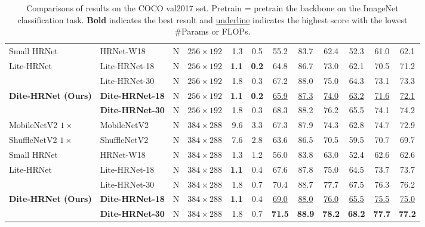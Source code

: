\documentclass{article}
\begin{document}
\begin{table*}[t]
{\begin{tabular}{llclrccccccc}
Small HRNet \cite{wang:smallhrnet} & HRNet-W18 & N & $256 \times 192$ & 1.3 & 0.5 & 55.2 & 83.7 & 62.4 & 52.3 & 61.0 & 62.1\\

Lite-HRNet \cite{yu:litehrnet} & Lite-HRNet-18 & N & $256 \times 192$ & \textbf{1.1} & \textbf{0.2} & 64.8 & 86.7 & 73.0 & 62.1 & 70.5 & 71.2\\

& Lite-HRNet-30 & N & $256 \times 192$ & 1.8 & 0.3 & 67.2 & 88.0 & 75.0 & 64.3 & 73.1 & 73.3\\

\textbf{Dite-HRNet (Ours)} & \textbf{Dite-HRNet-18} & N & $256 \times 192$ & \textbf{1.1} & \textbf{0.2} &  \underline{65.9} & \underline{87.3} & \underline{74.0} & \underline{63.2} & \underline{71.6} & \underline{72.1}\\

& \textbf{Dite-HRNet-30} & N & $256 \times 192$ & 1.8 & 0.3 & 68.3 & 88.2 & 76.2 & 65.5 & 74.1 & 74.2\\
\midrule
MobileNetV2 $1 \times$ \cite{sandler:mobile2} & MobileNetV2 & N & $384 \times 288$ & 9.6 & 3.3 & 67.3 & 87.9 & 74.3 & 62.8 & 74.7 & 72.9\\

ShuffleNetV2 $1 \times$ \cite{ma:shuffle2} & ShuffleNetV2 & N & $384 \times 288$ & 7.6 & 2.8 & 63.6 & 86.5 & 70.5 & 59.5 & 70.7 & 69.7\\

Small HRNet \cite{wang:smallhrnet} & HRNet-W18 & N & $384 \times 288$ & 1.3 & 1.2 & 56.0 & 83.8 & 63.0 & 52.4 & 62.6 & 62.6\\

Lite-HRNet \cite{yu:litehrnet} & Lite-HRNet-18 & N & $384 \times 288$ & \textbf{1.1} & 0.4 & 67.6 & 87.8 & 75.0 & 64.5 & 73.7 & 73.7\\

& Lite-HRNet-30 & N & $384 \times 288$ & 1.8 & 0.7 & 70.4 & 88.7 & 77.7 & 67.5 & 76.3 & 76.2\\

\textbf{Dite-HRNet (Ours)} & \textbf{Dite-HRNet-18} & N & $384 \times 288$ & \textbf{1.1} & 0.4 & \underline{69.0} & \underline{88.0} & \underline{76.0} & \underline{65.5} & \underline{75.5} & \underline{75.0}\\

& \textbf{Dite-HRNet-30} & N & $384 \times 288$ & 1.8 & 0.7 & \textbf{71.5} & \textbf{88.9} & \textbf{78.2} & \textbf{68.2} & \textbf{77.7} & \textbf{77.2}\\
\bottomrule
\end{tabular}}
\caption{Comparisons of results on the COCO val2017 set. Pretrain = pretrain the backbone on the ImageNet classification task. \textbf{Bold} indicates the best result and \underline{underline} indicates the highest score with the lowest \#Params or FLOPs.}
\label{tab2}
\end{table*}
\end{document}
